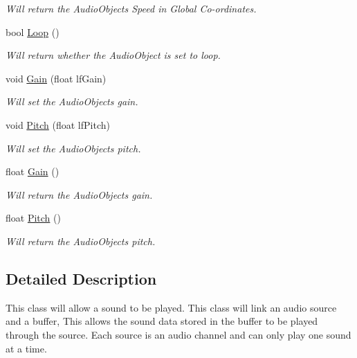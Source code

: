 \begin{DoxyCompactItemize}
\begin{DoxyCompactList}\small\item\em Will return the AudioObjects Speed in Global Co-\/ordinates. \end{DoxyCompactList}\item 
\hypertarget{classc_audio_object_a2917ae87b530830150d7a656386df6bf}{
bool \hyperlink{classc_audio_object_a2917ae87b530830150d7a656386df6bf}{Loop} ()}
\label{classc_audio_object_a2917ae87b530830150d7a656386df6bf}

\begin{DoxyCompactList}\small\item\em Will return whether the AudioObject is set to loop. \end{DoxyCompactList}\item 
\hypertarget{classc_audio_object_a89f8764ce51777e8a25df9d2d6c7f091}{
void \hyperlink{classc_audio_object_a89f8764ce51777e8a25df9d2d6c7f091}{Gain} (float lfGain)}
\label{classc_audio_object_a89f8764ce51777e8a25df9d2d6c7f091}

\begin{DoxyCompactList}\small\item\em Will set the AudioObjects gain. \end{DoxyCompactList}\item 
\hypertarget{classc_audio_object_aba4c49f2d57ed35ff90e53233e7b7902}{
void \hyperlink{classc_audio_object_aba4c49f2d57ed35ff90e53233e7b7902}{Pitch} (float lfPitch)}
\label{classc_audio_object_aba4c49f2d57ed35ff90e53233e7b7902}

\begin{DoxyCompactList}\small\item\em Will set the AudioObjects pitch. \end{DoxyCompactList}\item 
\hypertarget{classc_audio_object_a6ccea814b124d906c7e9e9fe63afe429}{
float \hyperlink{classc_audio_object_a6ccea814b124d906c7e9e9fe63afe429}{Gain} ()}
\label{classc_audio_object_a6ccea814b124d906c7e9e9fe63afe429}

\begin{DoxyCompactList}\small\item\em Will return the AudioObjects gain. \end{DoxyCompactList}\item 
\hypertarget{classc_audio_object_adb85eab7a36db5e5ad7236a4746f37ae}{
float \hyperlink{classc_audio_object_adb85eab7a36db5e5ad7236a4746f37ae}{Pitch} ()}
\label{classc_audio_object_adb85eab7a36db5e5ad7236a4746f37ae}

\begin{DoxyCompactList}\small\item\em Will return the AudioObjects pitch. \end{DoxyCompactList}\end{DoxyCompactItemize}


\subsection{Detailed Description}
This class will allow a sound to be played. This class will link an audio source and a buffer, This allows the sound data stored in the buffer to be played through the source. Each source is an audio channel and can only play one sound at a time. 